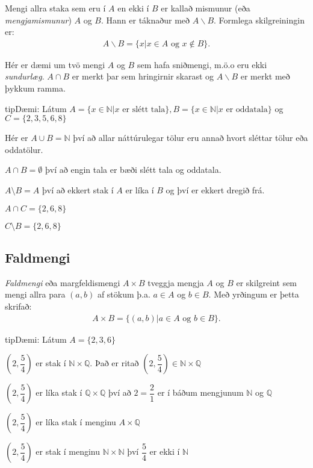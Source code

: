 \documentclass[a4paper,10pt,icelandic]{sphinxmanual}
\begin{document}
Mengi allra staka sem eru í \(A\) en ekki í \(B\) er kallað mismunur (eða \textit{mengjamismunur}) \(A\) og
\(B\). Hann er táknaður með \(A\backslash B\).
Formlega skilgreiningin er:
\begin{equation*}
\begin{split}A\backslash B = \{x| x \in A \text{ og }x \notin B\}.\end{split}
\end{equation*}

Hér er dæmi um tvö mengi \(A\) og \(B\) sem hafa sniðmengi, m.ö.o eru ekki \textit{sundurlæg}. \(A \cap B\) er merkt þar sem hringirnir skarast og \(A\backslash B\) er merkt með þykkum ramma.

\begin{sphinxadmonition}{tip}{Dæmi:}
Látum \(A=\{x\in\mathbb{N}|x\text{ er slétt tala}\},B=\{x\in\mathbb{N}|x\text{ er oddatala}\}\) og \(C=\{2,3,5,6,8\}\)

Hér er \(A\cup B=\mathbb{N}\) því að allar náttúrulegar tölur eru annað hvort sléttar tölur eða oddatölur.

\(A\cap B=\emptyset\) því að engin tala er bæði slétt tala og oddatala.

\(A\setminus B=A\) því að ekkert stak í \(A\) er líka í \(B\) og því er ekkert dregið frá.

\(A\cap C=\{2,6,8\}\)

\(C\setminus B=\{2,6,8\}\)
\end{sphinxadmonition}


\subsection{Faldmengi}
\label{\detokenize{Kafli04:faldmengi}}
\textit{Faldmengi} eða margfeldismengi \(A\times B\) tveggja mengja \(A\) og \(B\) er skilgreint sem mengi allra
para \((a,b)\) af stökum þ.a. \(a \in A\) og \(b \in B\). Með yrðingum er þetta skrifað:
\begin{equation*}
\begin{split}A\times B = \{(a,b)| a \in A \text{ og } b \in B\}.\end{split}
\end{equation*}
\begin{sphinxadmonition}{tip}{Dæmi:}
Látum \(A=\{2,3,6\}\)

\(\left(2,\dfrac{5}{4}\right)\) er stak í \(\mathbb{N}\times\mathbb{Q}\). Það er  ritað \(\left(2,\dfrac{5}{4}\right)\in \mathbb{N}\times\mathbb{Q}\)

\(\left(2,\dfrac{5}{4}\right)\) er líka stak í \(\mathbb{Q}\times\mathbb{Q}\) því að \(2=\dfrac{2}{1}\) er í báðum mengjunum \(\mathbb{N}\) og \(\mathbb{Q}\)

\(\left(2,\dfrac{5}{4}\right)\) er líka stak í menginu \(A\times\mathbb{Q}\)

\(\left(2,\dfrac{5}{4}\right)\) er  stak í menginu \(\mathbb{N}\times\mathbb{N}\) því \(\dfrac{5}{4}\) er ekki í \(\mathbb{N}\)
\end{sphinxadmonition}
\end{document}
